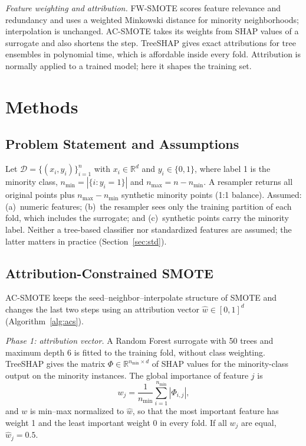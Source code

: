 \documentclass[conference,a4paper]{IEEEtran}
\newcommand{\acs}{AC-SMOTE}
\begin{document}
\textit{Feature weighting and attribution.} FW-SMOTE \cite{maldonado2022fw} scores feature relevance and redundancy and uses a weighted Minkowski distance for minority neighborhoods; interpolation is unchanged. \acs{} takes its weights from SHAP values \cite{lundberg2017unified} of a surrogate and also shortens the step. TreeSHAP \cite{lundberg2020local} gives exact attributions for tree ensembles in polynomial time, which is affordable inside every fold. Attribution is normally applied to a trained model; here it shapes the training set.

\section{Methods}\label{sec:methods}
\subsection{Problem Statement and Assumptions}
Let $\mathcal{D}=\{(x_i,y_i)\}_{i=1}^{n}$ with $x_i\in\mathbb{R}^d$ and $y_i\in\{0,1\}$, where label 1 is the minority class, $n_{\min}=|\{i:y_i=1\}|$ and $n_{\max}=n-n_{\min}$. A resampler returns all original points plus $n_{\max}-n_{\min}$ synthetic minority points (1:1 balance). Assumed: (a)~numeric features; (b)~the resampler sees only the training partition of each fold, which includes the surrogate; and (c)~synthetic points carry the minority label. Neither a tree-based classifier nor standardized features are assumed; the latter matters in practice (Section~\ref{sec:std}).

\subsection{Attribution-Constrained SMOTE}\label{sec:method}
\acs{} keeps the seed--neighbor--interpolate structure of SMOTE and changes the last two steps using an attribution vector $\hat{w}\in[0,1]^d$ (Algorithm~\ref{alg:acs}).

\textit{Phase 1: attribution vector.} A Random Forest surrogate \cite{breiman2001random} with 50 trees and maximum depth 6 is fitted to the training fold, without class weighting. TreeSHAP gives the matrix $\Phi\in\mathbb{R}^{n_{\min}\times d}$ of SHAP values for the minority-class output on the minority instances. The global importance of feature $j$ is
\begin{equation}
w_j=\frac{1}{n_{\min}}\sum_{i=1}^{n_{\min}}|\Phi_{i,j}|,
\end{equation}
and $w$ is min--max normalized to $\hat{w}$, so that the most important feature has weight 1 and the least important weight 0 in every fold. If all $w_j$ are equal, $\hat{w}_j=0.5$.
\end{document}
